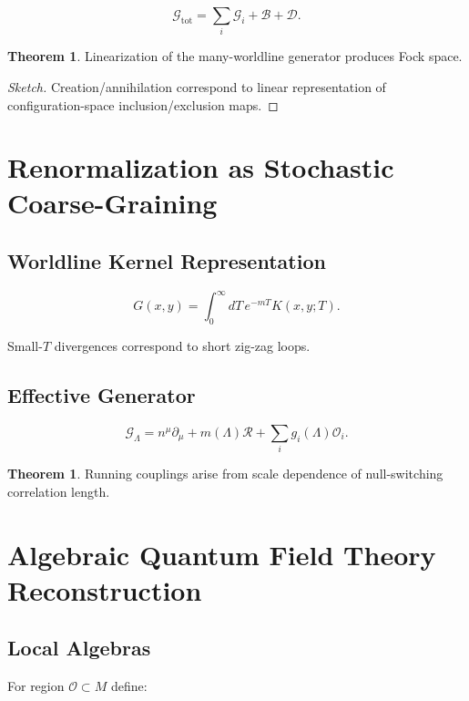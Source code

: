 \documentclass[11pt]{article}
\theoremstyle{definition}
\newtheorem{theorem}[definition]{Theorem}
\begin{document}
\[
\mathcal{G}_\text{tot}
=
\sum_i \mathcal{G}_i
+
\mathcal{B}
+
\mathcal{D}.
\]

\begin{theorem}
Linearization of the many-worldline generator produces Fock space.
\end{theorem}

\begin{proof}[Sketch]
Creation/annihilation correspond to linear representation of
configuration-space inclusion/exclusion maps.
\end{proof}

\section{Renormalization as Stochastic Coarse-Graining}

\subsection{Worldline Kernel Representation}

\[
G(x,y)
=
\int_0^\infty dT \, e^{-mT} K(x,y;T).
\]

Small-$T$ divergences correspond to short zig-zag loops.

\subsection{Effective Generator}

\[
\mathcal{G}_\Lambda
=
n^\mu\partial_\mu
+
m(\Lambda)\mathcal{R}
+
\sum_i g_i(\Lambda)\mathcal{O}_i.
\]

\begin{theorem}
Running couplings arise from scale dependence of null-switching
correlation length.
\end{theorem}

\section{Algebraic Quantum Field Theory Reconstruction}

\subsection{Local Algebras}

For region $\mathcal{O}\subset M$ define:
\end{document}
